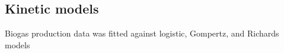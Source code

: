\subsection{Kinetic models}
Biogas production data was fitted against logistic, Gompertz, and
Richards models